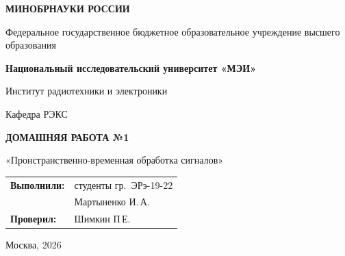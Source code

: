 \begin{titlepage}
    \centering
    {\bfseries МИНОБРНАУКИ РОССИИ\par}
    Федеральное государственное бюджетное образовательное учреждение высшего образования \\
    {\bfseries Национальный исследовательский университет «МЭИ»\par}
    \vspace{1cm}
    Институт радиотехники и электроники\par
    Кафедра РЭКС\par
    \vspace{3cm}
    
    {\bfseries\large ДОМАШНЯЯ РАБОТА №1\par}
    \vspace{0.5cm}
    {\large «Пронстранственно-временная обработка сигналов»\par}
    
    \vspace{3.5cm}
 \vspace{1.5cm}
\noindent\hfill
\begin{tabular}{@{}ll@{}}
    \textbf{Выполнили:} & студенты гр.~ЭРэ-19-22 \\
                        & Мартыненко И.\,А. \\
    \textbf{Проверил:}  & Шимкин П\,Е.
\end{tabular}   
    \vfill
    {Москва, 2026}
\end{titlepage}
